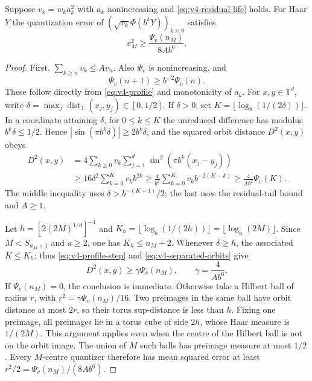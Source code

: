 \begin{lemma}\label{lem:v4-smallballs}
Suppose $v_k=w_ka_k^2$ with $a_k$ nonincreasing and
\eqref{eq:v4-residual-life} holds. For Haar $Y$ the quantization error
of $(\sqrt{v_k}\Phi(b^kY))_{k\ge0}$ satisfies
\begin{equation}
 e_M^2\ge \frac{\Psi_v(n_M)}{8Ab^6}.                             \label{eq:v4-orbit-smallball}
\end{equation}
\end{lemma}
\begin{proof}
First, $\sum_{k\ge n}v_k\le A v_n$. Also $\Psi_v$ is nonincreasing,
and
\begin{equation}
 \Psi_v(n+1)\ge b^{-2}\Psi_v(n).                                \label{eq:v4-profile-step}
\end{equation}
These follow directly from \eqref{eq:v4-profile} and monotonicity of
$a_k$.
For $x,y\in\mathbb T^d$, write
$\delta=\max_j\operatorname{dist}_{\mathbb T}(x_j,y_j)\in[0,1/2]$.
If $\delta>0$, set $K=\lfloor\log_b(1/(2\delta))\rfloor$.
In a coordinate attaining $\delta$, for $0\le k\le K$ the unreduced
difference has modulus $b^k\delta\le1/2$. Hence
$|\sin(\pi b^k\delta)|\ge2b^k\delta$, and the squared orbit distance
$D^2(x,y)$ obeys
\begin{align}
 D^2(x,y)
 &=4\sum_{k\ge0}v_k\sum_{j=1}^d
          \sin^2(\pi b^k(x_j-y_j))\nonumber\\
 &\ge16\delta^2\sum_{k=0}^Kv_kb^{2k}
 \ge \frac4{b^2}\sum_{k=0}^Kv_kb^{-2(K-k)}
 \ge\frac4{Ab^2}\Psi_v(K).                                    \label{eq:v4-separated-orbits}
\end{align}
The middle inequality uses $\delta>b^{-(K+1)}/2$; the last uses the
residual-tail bound and $A\ge1$.

Let $h=[2(2M)^{1/d}]^{-1}$ and
$K_h=\lfloor\log_b(1/(2h))\rfloor=\lfloor\log_a(2M)\rfloor$.
Since $M<S_{n_M+1}$ and $a\ge2$, one has $K_h\le n_M+2$.
Whenever $\delta\ge h$, the associated $K\le K_h$; thus
\eqref{eq:v4-profile-step} and \eqref{eq:v4-separated-orbits} give
\[
 D^2(x,y)\ge\gamma\Psi_v(n_M),\qquad \gamma=\frac4{Ab^6}.
\]
If $\Psi_v(n_M)=0$, the conclusion is immediate. Otherwise take a
Hilbert ball of radius $r$, with
$r^2=\gamma\Psi_v(n_M)/16$. Two preimages in the same ball have
orbit distance at most $2r$, so their torus sup-distance is less than
$h$. Fixing one preimage, all preimages lie in a torus cube of side
$2h$, whose Haar measure is $1/(2M)$. This argument applies even when
the centre of the Hilbert ball is not on the orbit image.
The union of $M$ such balls has preimage measure at most $1/2$.
Every $M$-centre quantizer therefore has mean squared error at least
$r^2/2=\Psi_v(n_M)/(8Ab^6)$.
\end{proof}

